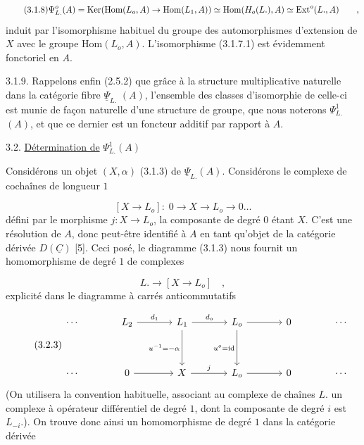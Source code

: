 \begin{equation}\tag{3.1.8}
\Psi^{o}_{L.} (A) = \mathrm{Ker}(\mathrm{Hom}(L_o,A) \to \mathrm{Hom}(L_1,A)) \simeq \mathrm{Hom}(H_o(L.),A) \\ \simeq \mathrm{Ext}^{o}(L.,A) \qquad ,
\end{equation}
induit par l'isomorphisme habituel du groupe des automorphismes d'extension de $X$ avec le groupe $\mathrm{Hom}(L_o,A)$. L'isomorphisme (3.1.7.1) est évidemment fonctoriel en $A$.

3.1.9.  Rappelons enfin (2.5.2) que grâce à la structure multiplicative naturelle dans la catégorie fibre $\underline{\Psi}_{L.}$ $(A)$, l'ensemble des classes d'isomorphie de celle-ci est munie de façon naturelle d'une structure de groupe, que nous noterons $\Psi^{1}_{L.}$ $(A)$, et que ce dernier est un foncteur additif par rapport à $A$.




3.2. \underline{Détermination de} $\Psi^1_{L.} (A)$

Considérons un objet $(X,\alpha)$ (3.1.3) de $\underline{\Psi}_{L.} (A)$. Considérons le complexe de cochaînes de longueur $1$

\begin{equation}\tag{3.2.1}
[X \to L_o] : \; 0 \longrightarrow X \longrightarrow L_o \longrightarrow 0 \ldots
\end{equation}
défini par le morphisme $j : X \longrightarrow L_o$, la composante de degré $0$ étant $X$. C'est une résolution de $A$, donc peut-être identifié à $A$ en tant qu'objet de la catégorie dérivée $D(\underline{C})$ [5]. Ceci posé, le diagramme (3.1.3) nous fournit un homomorphisme de degré $1$ de complexes

\begin{equation}\tag{3.2.2}
L. \longrightarrow [X \longrightarrow L_o] \quad ,
\end{equation}
explicité dans le diagramme à carrés anticommutatifs

\begin{equation}\tag{3.2.3}
\begin{tikzcd}[column sep=large, row sep=huge]
\cdots & L_2 \arrow[r, "d_1"] & L_1 \arrow[r, "d_o"] \arrow[d, "u^{-1} = -\alpha"'] & L_o \arrow[r] \arrow[d, "u^o = \mathrm{id}"'] & 0 & \cdots \\
\cdots & 0 \arrow[r] & X \arrow[r, "j"] & L_o \arrow[r] & 0 & \cdots
\end{tikzcd}
\end{equation}
(On utilisera la convention habituelle, associant au complexe de chaînes $L.$ un complexe à opérateur différentiel de degré $1$, dont la composante de degré $i$ est $L_{-i}$.). On trouve donc ainsi un homomorphisme de degré $1$ dans la catégorie dérivée

